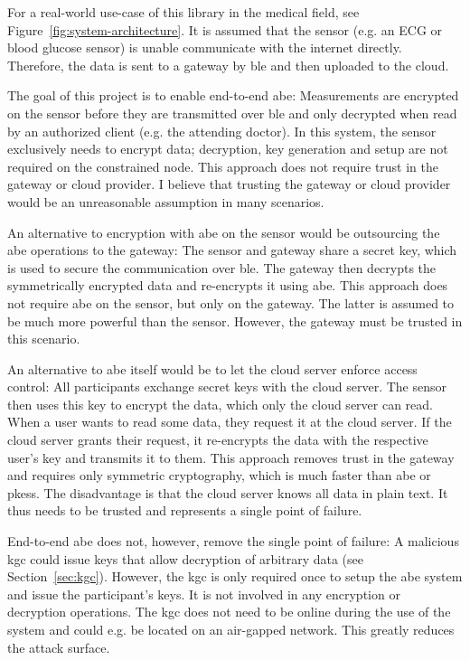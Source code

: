 For a real-world use-case of this library in the medical field, see Figure~\ref{fig:system-architecture}.
It is assumed that the sensor (e.g. an ECG or blood glucose sensor) is unable communicate with the internet directly.
Therefore, the data is sent to a gateway by \acrfull{ble} and then uploaded to the cloud.

The goal of this project is to enable end-to-end \acrlong{abe}:
Measurements are encrypted on the sensor before they are transmitted over \acrshort{ble} and only decrypted when read by an authorized client (e.g. the attending doctor).
In this system, the sensor exclusively needs to encrypt data; decryption, key generation and setup are not required on the constrained node.
This approach does not require trust in the gateway or cloud provider.
I believe that trusting the gateway or cloud provider would be an unreasonable assumption in many scenarios.

An alternative to encryption with \acrshort{abe} on the sensor would be outsourcing the \acrshort{abe} operations to the gateway:
The sensor and gateway share a secret key, which is used to secure the communication over \acrshort{ble}.
The gateway then decrypts the symmetrically encrypted data and re-encrypts it using \acrshort{abe}.
This approach does not require \acrshort{abe} on the sensor, but only on the gateway.
The latter is assumed to be much more powerful than the sensor.
However, the gateway must be trusted in this scenario.

An alternative to \acrshort{abe} itself would be to let the cloud server enforce access control:
All participants exchange secret keys with the cloud server.
The sensor then uses this key to encrypt the data, which only the cloud server can read.
When a user wants to read some data, they request it at the cloud server.
If the cloud server grants their request, it re-encrypts the data with the respective user's key and transmits it to them.
This approach removes trust in the gateway and requires only symmetric cryptography, which is much faster than \acrshort{abe} or \glspl{pkes}.
The disadvantage is that the cloud server knows all data in plain text. It thus needs to be trusted and represents a single point of failure.

End-to-end \acrshort{abe} does not, however, remove the single point of failure:
A malicious \acrfull{kgc} could issue keys that allow decryption of arbitrary data (see Section~\ref{sec:kgc}).
However, the \acrfull{kgc} is only required once to setup the \acrshort{abe} system and issue the participant's keys.
It is not involved in any encryption or decryption operations.
The \acrshort{kgc} does not need to be online during the use of the system and could e.g. be located on an air-gapped network. 
This greatly reduces the attack surface.
~\\


